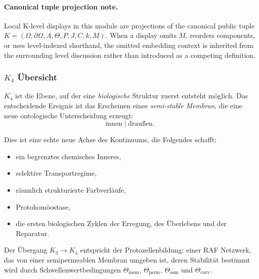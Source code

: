 



\paragraph{Canonical tuple projection note.}
Local K-level displays in this module are projections of the canonical public tuple \(K=(\Omega,\partial\Omega,A,\Theta,P,J,C,k,M)\). When a display omits \(M\), reorders components, or uses level-indexed shorthand, the omitted embedding context is inherited from the surrounding level discussion rather than introduced as a competing definition.

\subsubsection{\texorpdfstring{$K_4$}{K_4} Übersicht}
\label{sec:k4-overview}

$K_4$ ist die Ebene, auf der eine \emph{biologische} Struktur zuerst entsteht
möglich. Das entscheidende Ereignis ist das Erscheinen eines \emph{semi-stable
Membran}, die eine neue ontologische Unterscheidung erzeugt:
\[
\text{innen} \;|\; \text{draußen}.
\]

Dies ist eine echte neue Achse des Kontinuums, die Folgendes schafft:
\begin{itemize}
    \item ein begrenztes chemisches Inneres,
    \item selektive Transportregime,
    \item räumlich strukturierte Farbverläufe,
    \item Protohomöostase,
    \item die ersten biologischen Zyklen der Erregung, des Überlebens und der Reparatur.
\end{itemize}

Der Übergang $K_3 \to K_4$ entspricht der Protozellenbildung: einer RAF
Netzwerk, das von einer semipermeablen Membran umgeben ist, deren Stabilität bestimmt wird
durch Schwellenwertbedingungen $\Theta_{\mathrm{mem}}$,
$\Theta_{\mathrm{perm}}$, $\Theta_{\mathrm{osm}}$ und
$\Theta_{\mathrm{curv}}$.

